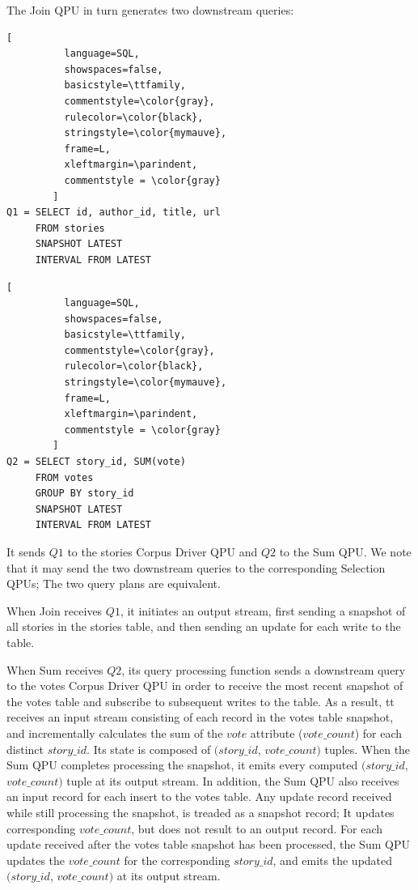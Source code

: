 The Join QPU in turn generates two downstream queries:

\begin{lstlisting}[
          language=SQL,
          showspaces=false,
          basicstyle=\ttfamily,
          commentstyle=\color{gray},
          rulecolor=\color{black},
          stringstyle=\color{mymauve},
          frame=L,
          xleftmargin=\parindent,
          commentstyle = \color{gray}
        ]
Q1 = SELECT id, author_id, title, url
     FROM stories
     SNAPSHOT LATEST
     INTERVAL FROM LATEST
\end{lstlisting}

\begin{lstlisting}[
          language=SQL,
          showspaces=false,
          basicstyle=\ttfamily,
          commentstyle=\color{gray},
          rulecolor=\color{black},
          stringstyle=\color{mymauve},
          frame=L,
          xleftmargin=\parindent,
          commentstyle = \color{gray}
        ]
Q2 = SELECT story_id, SUM(vote)
     FROM votes
     GROUP BY story_id
     SNAPSHOT LATEST
     INTERVAL FROM LATEST
\end{lstlisting}

\noindent
It sends $Q1$ to the stories Corpus Driver QPU and $Q2$ to the Sum QPU.
We note that it may send the two downstream queries to the corresponding Selection QPUs;
The two query plans are equivalent.

\smallskip
\noindent
When Join receives $Q1$, it initiates an output stream,
first sending a snapshot of all stories in the stories table,
and then sending an update for each write to the table.

\smallskip
\noindent
When Sum receives $Q2$, its query processing function sends a downstream query to the votes Corpus Driver QPU
in order to receive the most recent snapshot of the votes table and subscribe to subsequent writes to the table.
As a result, tt receives an input stream consisting of each record in the votes table snapshot,
and incrementally calculates the sum of the $vote$ attribute ($vote\_count$) for each distinct $story\_id$.
Its state is composed of $(story\_id$, $vote\_count)$ tuples.
When the Sum QPU completes processing the snapshot, it emits every computed $(story\_id$, $vote\_count)$ tuple
at its output stream.
In addition, the Sum QPU also receives an input record for each insert to the votes table.
Any update record received while still processing the snapshot, is treaded as a snapshot record;
It updates corresponding $vote\_count$, but does not result to an output record.
For each update received after the votes table snapshot has been processed,
the Sum QPU updates the $vote\_count$ for the corresponding $story\_id$,
and emits the updated $(story\_id$, $vote\_count)$ at its output stream.

